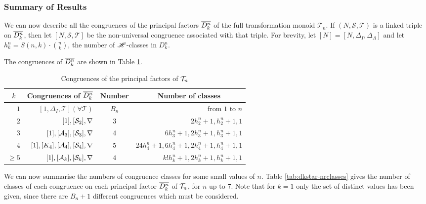 \subsubsection{Summary of Results}
\label{sec:summary}
We can now describe all the congruences of the principal factors $\overline{D_k^n}$ of
the full transformation monoid $\mathcal{T}_n$.  If
$(N,\mathcal{S},\mathcal{T})$ is a linked triple on $\overline{D_k^n}$, then let
$[N,\mathcal{S},\mathcal{T}]$ be the non-universal congruence associated with
that triple.  For brevity, let $[N] = [N, \Delta_I, \Delta_\Lambda]$ and let
$h_k^n = S(n,k) \cdot \binom{n}{k}$, the number of $\mathrel{\mathscr{H}}$-classes in $D_k^n$.

\begin{theorem}
  \label{thm:dkstar-congs}
  The congruences of $\overline{D_k^n}$ are shown in Table \ref{tab:dkstar-congs}.
  \begin{table}[h]
    \centering
    \renewcommand{\arraystretch}{1.3}
    \begin{tabular}{| r | r | c | r |}
      \hline
      \multicolumn{1}{|c|}{$k$} & \multicolumn{1}{c|}{\textbf{Congruences of $\overline{D_k^n}$}} & \textbf{Number} & \multicolumn{1}{c|}{\textbf{Number of classes}} \\
      \hline
      $1$ & $[1, \Delta_I, \mathcal{T}] (\forall \mathcal{T})$ & $B_n$
          & from $1$ to $n$ \\
      $2$ & $[1], [\mathcal{S}_2], \nabla$ & $3$ & $2h_2^n+1, h_2^n+1, 1$ \\
      $3$ & $[1], [\mathcal{A}_3], [\mathcal{S}_3], \nabla$ & $4$ & $6h_3^n+1, 2h_3^n+1, h_3^n+1, 1$ \\
      $4$ & $[1], [K_4], [\mathcal{A}_4], [\mathcal{S}_4], \nabla$ & $5$ & $24h_4^n+1, 6h_4^n+1, 2h_4^n+1, h_4^n+1, 1$ \\
      $\geq 5$ & $[1], [\mathcal{A}_k], [\mathcal{S}_k], \nabla$ & $4$ & $k!h_k^n+1, 2h_k^n+1, h_k^n+1, 1$ \\
      \hline
    \end{tabular}
    \caption{Congruences of the principal factors of $\mathcal{T}_n$}
    \label{tab:dkstar-congs}
  \end{table}
\end{theorem}

We can now summarise the numbers of congruence classes for some small values of
$n$.  Table \ref{tab:dkstar-nrclasses} gives the number of classes of each
congruence on each principal factor $\overline{D_k^n}$ of $\mathcal{T}_n$, for $n$ up to $7$.
Note that for $k=1$ only the set of distinct values has been given, since there
are $B_n+1$ different congruences which must be considered.

